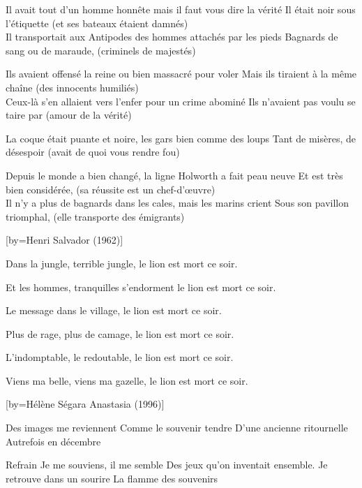\beginverse
Il avait tout d'un homme honnête mais il faut vous dire la vérité
Il était noir sous l'étiquette (et ses bateaux étaient damnés) \\[bis]
Il transportait aux Antipodes des hommes attachés par les pieds
Bagnards de sang ou de maraude, (criminels de majestés) \\[bis]
\endverse

\beginverse
Ils avaient offensé la reine ou bien massacré pour voler
Mais ils tiraient à la même chaîne (des innocents humiliés) \\[bis]
Ceux-là s'en allaient vers l'enfer pour un crime abominé
Ils n'avaient pas voulu se taire par (amour de la vérité) \\[bis]
\endverse

\beginverse
La coque était puante et noire, les gars bien comme des loups
Tant de misères, de désespoir (avait de quoi vous rendre fou) \\[bis]
\endverse

\beginverse
Depuis le monde a bien changé, la ligne Holworth a fait peau neuve
Et est très bien considérée, (sa réussite est un chef-d'œuvre) \\[bis]
Il n'y a plus de bagnards dans les cales, mais les marins crient
Sous son pavillon triomphal, (elle transporte des émigrants) \\[bis]
\endverse

[by={Henri Salvador (1962)}]

\beginverse
Dans la jungle,
terrible jungle,
le lion est mort ce soir.
\endverse

\beginverse
Et les hommes,
tranquilles s'endorment
le lion est mort ce soir.
\endverse

\beginverse
Le message
dans le village,
le lion est mort ce soir.
\endverse

\beginverse
Plus de rage,
plus de camage,
le lion est mort ce soir.
\endverse

\beginverse
L'indomptable,
le redoutable,
le lion est mort ce soir.
\endverse

\beginverse
Viens ma belle,
viens ma gazelle,
le lion est mort ce soir.
\endverse

[by={Hélène Ségara \- Anastasia (1996)}]

\beginverse
Des images me reviennent
Comme le souvenir tendre
D'une ancienne ritournelle
Autrefois en décembre
\endverse

\beginverse
Refrain
Je me souviens, il me semble
Des jeux qu'on inventait ensemble.
Je retrouve dans un sourire
La flamme des souvenirs
\endverse


